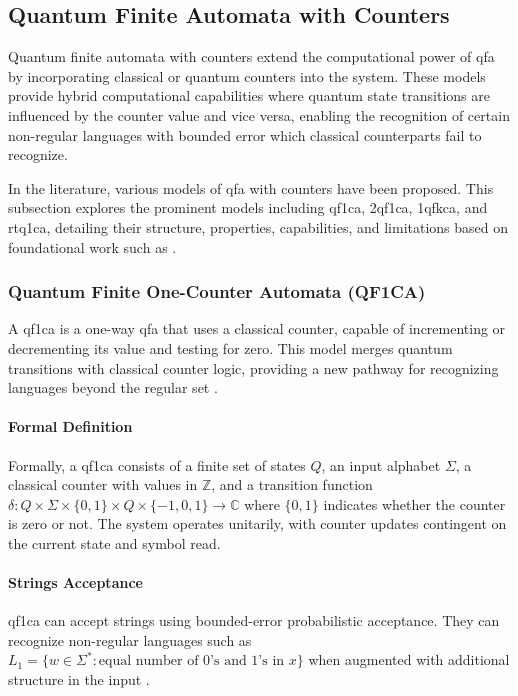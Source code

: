 \subsection{Quantum Finite Automata with Counters}
\label{sec:qfa-with-counters}

Quantum finite automata with counters extend the computational power of \gls{qfa} by incorporating classical or quantum counters into the system. These models provide hybrid computational capabilities where quantum state transitions are influenced by the counter value and vice versa, enabling the recognition of certain non-regular languages with bounded error which classical counterparts fail to recognize.

In the literature, various models of \gls{qfa} with counters have been proposed. This subsection explores the prominent models including \gls{qf1ca}, \gls{2qf1ca}, \gls{1qfkca}, and \gls{rtq1ca}, detailing their structure, properties, capabilities, and limitations based on foundational work such as \cite{bonner2001quantum, kravtsev1999quantum, pani2011empowering, cem2012quantum}.

\subsubsection{Quantum Finite One-Counter Automata (QF1CA)}

A \gls{qf1ca} is a one-way \gls{qfa} that uses a classical counter, capable of incrementing or decrementing its value and testing for zero. This model merges quantum transitions with classical counter logic, providing a new pathway for recognizing languages beyond the regular set \cite{kravtsev1999quantum}.

\paragraph{Formal Definition} 
Formally, a \gls{qf1ca} consists of a finite set of states $Q$, an input alphabet $\Sigma$, a classical counter with values in $\mathbb{Z}$, and a transition function $\delta: Q \times \Sigma \times \{0,1\} \times Q \times \{-1,0,1\} \rightarrow \mathbb{C}$ where $\{0,1\}$ indicates whether the counter is zero or not. The system operates unitarily, with counter updates contingent on the current state and symbol read.

\paragraph{Strings Acceptance} 
\gls{qf1ca} can accept strings using bounded-error probabilistic acceptance. They can recognize non-regular languages such as $L_1 = \{ w \in \Sigma^* : \text{equal number of 0's and 1's in } x \}$ when augmented with additional structure in the input \cite{bonner2001quantum}.

